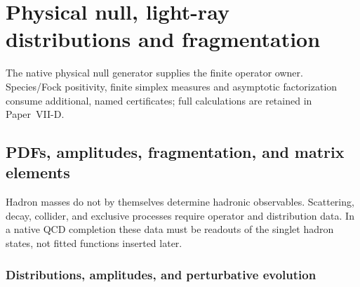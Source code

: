 \documentclass[12pt,a4paper]{article}
\begin{document}


\section{Physical null, light-ray distributions and fragmentation}
\label{p11:sec:v237-b5}
The native physical null generator supplies the finite operator owner. Species/Fock positivity, finite simplex measures and asymptotic factorization consume additional, named certificates; full calculations are retained in Paper~VII-D.

\subsection[PDFs, distribution amplitudes, fragmentation, and matrix elements]
{PDFs, amplitudes, fragmentation, and matrix elements}
\label{p11:sec:hadronic-distributions}

Hadron masses do not by themselves determine hadronic observables.  Scattering, decay, collider, and exclusive processes require operator and distribution data.  In a native QCD completion these data must be readouts of the singlet hadron states, not fitted functions inserted later.


\subsubsection{Distributions, amplitudes, and perturbative evolution}
\label{p11:subsec:distributions-amplitudes-perturbative-evolution}
\end{document}
